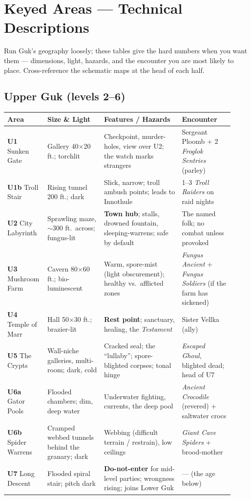 \documentclass[10pt,twoside]{report}
\begin{document}
\clearpage
\chapter{Keyed Areas --- Technical Descriptions}
\noindent Run Guk's geography loosely; these tables give the hard numbers when you want them --- dimensions, light, hazards, and the encounter you are most likely to place. Cross-reference the schematic maps at the head of each half.

\section{Upper Guk (levels 2--6)}
\renewcommand{\arraystretch}{1.25}
\begin{longtable}{@{}p{0.13\linewidth} p{0.24\linewidth} p{0.33\linewidth} p{0.22\linewidth}@{}}
\toprule
\textbf{\color{gukdeep}Area} & \textbf{\color{gukdeep}Size \& Light} & \textbf{\color{gukdeep}Features / Hazards} & \textbf{\color{gukdeep}Encounter} \\
\midrule
\endhead
\textbf{U1} Sunken Gate & Gallery 40$\times$20 ft.; torchlit & Checkpoint, murder-holes, view over U2; the watch marks strangers & Sergeant Ploomb + 2 \emph{Froglok Sentries} (parley) \\
\textbf{U1b} Troll Stair & Rising tunnel 200 ft.; dark & Slick, narrow; troll ambush points; leads to Innothule & 1--3 \emph{Troll Raiders} on raid nights \\
\textbf{U2} City Labyrinth & Sprawling maze, $\sim$300 ft.\ across; fungus-lit & \textbf{Town hub}; stalls, drowned fountain, sleeping-warrens; safe by default & The named folk; no combat unless provoked \\
\textbf{U3} Mushroom Farm & Cavern 80$\times$60 ft.; bio-luminescent & Warm, spore-mist (light obscurement); healthy vs.\ afflicted zones & \emph{Fungus Ancient} + \emph{Fungus Soldiers} (if the farm has sickened) \\
\textbf{U4} Temple of Marr & Hall 50$\times$30 ft.; brazier-lit & \textbf{Rest point}; sanctuary, healing, the \emph{Testament} & Sister Vellka (ally) \\
\textbf{U5} The Crypts & Wall-niche galleries, multi-room; dark, cold & Cracked seal; the ``lullaby''; spore-blighted corpses; tonal hinge & \emph{Escaped Ghoul}, blighted dead; head of U7 \\
\textbf{U6a} Gator Pools & Flooded chambers; dim, deep water & Underwater fighting, currents, the deep pool & \emph{Ancient Crocodile} (revered) + saltwater crocs \\
\textbf{U6b} Spider Warrens & Cramped webbed tunnels behind the granary; dark & Webbing (difficult terrain / restrain), low ceilings & \emph{Giant Cave Spiders} + brood-mother \\
\textbf{U7} Long Descent & Flooded spiral stair; pitch dark & \textbf{Do-not-enter} for mid-level parties; wrongness rising; joins Lower Guk & --- (the age below) \\
\bottomrule
\end{longtable}
\end{document}
